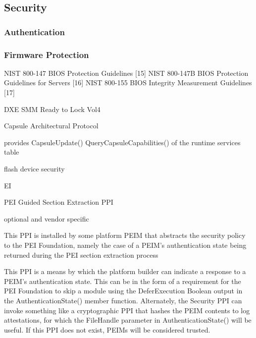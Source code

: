 
\subsection{Security}

\subsubsection{Authentication}


\subsubsection{Firmware Protection}

NIST 800-147 BIOS Protection Guidelines [15]
NIST 800-147B BIOS Protection Guidelines for Servers [16]
NIST 800-155 BIOS Integrity Measurement Guidelines [17]



DXE SMM Ready to Lock Vol4

Capsule Architectural Protocol

provides
CapsuleUpdate()
QueryCapsuleCapabilities()
of the runtime services table

flash device security




EI

PEI Guided Section Extraction PPI


optional and vendor specific

This PPI is installed by some platform PEIM that abstracts the security policy to the PEI Foundation,
namely the case of a PEIM's authentication state being returned during the PEI section extraction
process

This PPI is a means by which the platform builder can indicate a response to a PEIM's authentication
state. This can be in the form of a requirement for the PEI Foundation to skip a module using the
DeferExecution Boolean output in the AuthenticationState() member function.
Alternately, the Security PPI can invoke something like a cryptographic PPI that hashes the PEIM
contents to log attestations, for which the FileHandle parameter in
AuthenticationState() will be useful. If this PPI does not exist, PEIMs will be considered
trusted.

